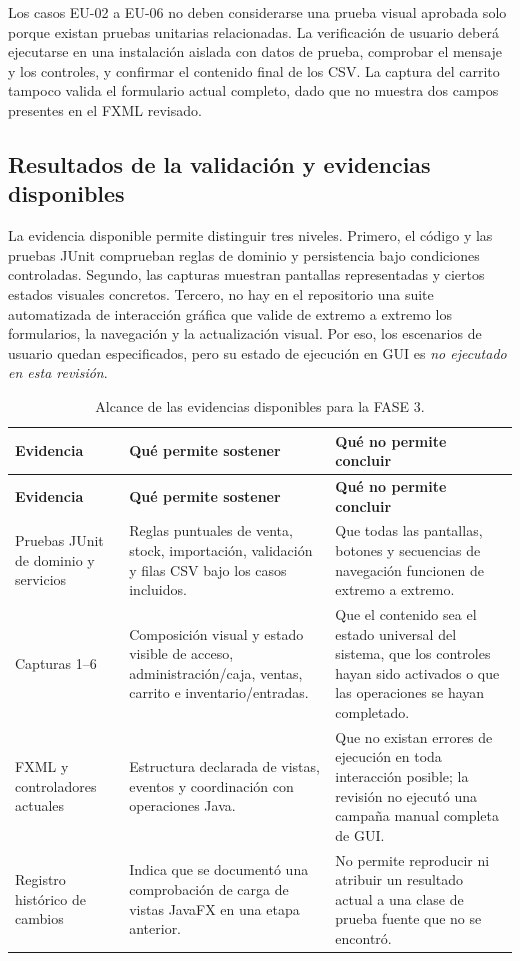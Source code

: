 Los casos EU-02 a EU-06 no deben considerarse una prueba visual aprobada solo porque existan pruebas unitarias relacionadas. La verificación de usuario deberá ejecutarse en una instalación aislada con datos de prueba, comprobar el mensaje y los controles, y confirmar el contenido final de los CSV. La captura del carrito tampoco valida el formulario actual completo, dado que no muestra dos campos presentes en el FXML revisado.

\subsection{Resultados de la validación y evidencias disponibles}

La evidencia disponible permite distinguir tres niveles. Primero, el código y las pruebas JUnit comprueban reglas de dominio y persistencia bajo condiciones controladas. Segundo, las capturas muestran pantallas representadas y ciertos estados visuales concretos. Tercero, no hay en el repositorio una suite automatizada de interacción gráfica que valide de extremo a extremo los formularios, la navegación y la actualización visual. Por eso, los escenarios de usuario quedan especificados, pero su estado de ejecución en GUI es \textit{no ejecutado en esta revisión}.

\begin{longtable}{|p{3.5cm}|p{4.6cm}|p{5.1cm}|}
\caption{Alcance de las evidencias disponibles para la FASE 3.}
\label{tab:evidencia-fase3}\\
\hline
\textbf{Evidencia} & \textbf{Qué permite sostener} & \textbf{Qué no permite concluir}\\
\hline
\endfirsthead
\hline
\textbf{Evidencia} & \textbf{Qué permite sostener} & \textbf{Qué no permite concluir}\\
\hline
\endhead
Pruebas JUnit de dominio y servicios & Reglas puntuales de venta, stock, importación, validación y filas CSV bajo los casos incluidos. & Que todas las pantallas, botones y secuencias de navegación funcionen de extremo a extremo.\\
\hline
Capturas 1--6 & Composición visual y estado visible de acceso, administración/caja, ventas, carrito e inventario/entradas. & Que el contenido sea el estado universal del sistema, que los controles hayan sido activados o que las operaciones se hayan completado.\\
\hline
FXML y controladores actuales & Estructura declarada de vistas, eventos y coordinación con operaciones Java. & Que no existan errores de ejecución en toda interacción posible; la revisión no ejecutó una campaña manual completa de GUI.\\
\hline
Registro histórico de cambios & Indica que se documentó una comprobación de carga de vistas JavaFX en una etapa anterior. & No permite reproducir ni atribuir un resultado actual a una clase de prueba fuente que no se encontró.\\
\hline
\end{longtable}
